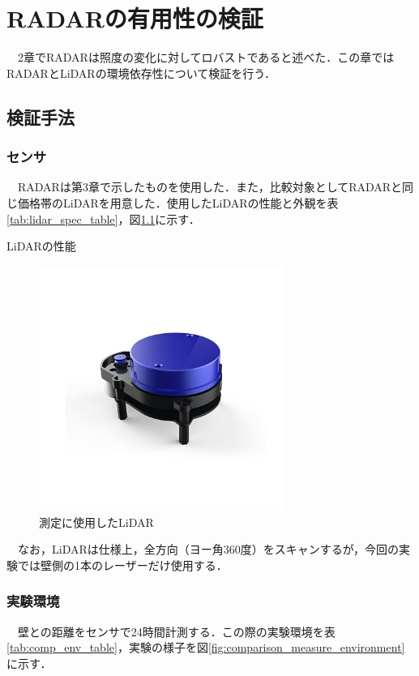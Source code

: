 \chapter{RADARの有用性の検証}
　2章でRADARは照度の変化に対してロバストであると述べた．この章ではRADARとLiDARの環境依存性について検証を行う．

\section{検証手法}
\subsection{センサ}
　RADARは第3章で示したものを使用した．また，比較対象としてRADARと同じ価格帯のLiDARを用意した．使用したLiDARの性能と外観を表\ref{tab:lidar_spec_table}，図\ref{fig:lidar}に示す．\cite{lidar_datasheet}

\begin{table}[htbp]
    \centering
    \caption{LiDARの性能}
    
    \label{tab:lidar_spec_table}
\end{table}

\begin{figure}[H]
    \centering
    \includegraphics[width=8cm]{./fig/lidar.jpg}
    \caption{測定に使用したLiDAR}
    \label{fig:lidar}
\end{figure}

　なお，LiDARは仕様上，全方向（ヨー角360度）をスキャンするが，今回の実験では壁側の1本のレーザーだけ使用する．

\subsection{実験環境}
　壁との距離をセンサで24時間計測する．この際の実験環境を表\ref{tab:comp_env_table}，実験の様子を図\ref{fig:comparison_measure_environment}に示す．

